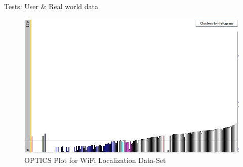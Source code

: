 \documentclass[aspectratio=169]{beamer}
\begin{document}
\begin{frame}{Tests: User \& Real world data}
	\begin{figure}[h]
		\centering
		\includegraphics[width=.64\textwidth]{user_wifi_optics}
		\caption{OPTICS Plot for WiFi Localization Data-Set}
		\label{fig:user_wifi_optics}
	\end{figure}
\end{frame}
\end{document}
